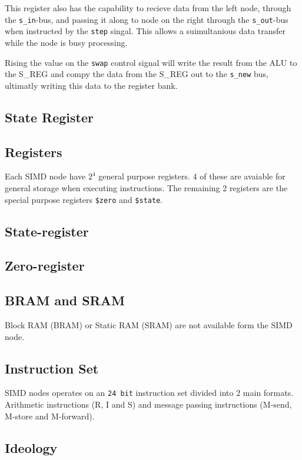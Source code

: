This register also has the capability to recieve data from the left node,
through the {\tt s\_in}-bus, and passing it along to node on the right through
the {\tt s\_out}-bus when instructed by the {\tt step} singal. This allows a
suimultanious data transfer while the node is busy processing.

Rising the value on the {\tt swap} control signal will write the result from the
ALU to the S\_REG and compy the data from the S\_REG out to the {\tt s\_new}
bus, ultimatly writing this data to the register bank.

\subsection{State Register}

\subsection{Registers}
Each SIMD node have $2^4$ general purpose registers. 4 of these are avaiable for
general storage when executing instructions. The remaining 2 registers are the
special purpose registers {\tt \$zero} and {\tt \$state}.



\subsection{State-register}

\subsection{Zero-register}

\subsection{BRAM and SRAM}
Block RAM (BRAM) or Static RAM (SRAM) are not available form the SIMD node.

\subsection{Instruction Set}
SIMD nodes operates on an {\tt 24 bit} instruction set divided into 2 main
formats. Arithmetic instructions (R, I and S) and message passing instructions
(M-send, M-store and M-forward).

\subsection{Ideology}

